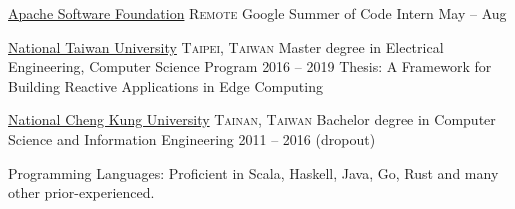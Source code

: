\documentclass[10pt,a4paper]{article}
\begin{document}
\headedsection  %
  {\href{https://summerofcode.withgoogle.com/archive/2018/projects/5211013825691648/}{Apache Software Foundation}}
  {\textsc{Remote}} {%
  \vspace{0.2em}
  \headedsubsection
    {Google Summer of Code Intern}
    {May  -- Aug }
    {}
}

\vspace{0.7em}

\spacedhrule{0em}{-0.4em}


\vspace{0.2em}

\headedsection
  {\href{https://www.ntu.edu.tw}{National Taiwan University}}
  {\textsc{Taipei, Taiwan}} {%
  \headedsubsection
    {Master degree in Electrical Engineering, Computer Science Program}
    {2016 -- 2019}
    {}
    \headedsubsection
    {Thesis: A Framework for Building Reactive Applications in Edge Computing}{}{}
}

\vspace{0.2em}

\headedsection
  {\href{https://web.ncku.edu.tw}{National Cheng Kung University}}
  {\textsc{Tainan, Taiwan}} {%
  \headedsubsection
    {Bachelor degree in Computer Science and Information Engineering}
    {2011 -- 2016 (dropout)}
    {}
}

\vspace{0.7em}

\spacedhrule{0em}{-0.4em}


\vspace{0.2em}

\inlineheadsection
  {Programming Languages:}
  {Proficient in Scala, Haskell, Java, Go, Rust and many other prior-experienced.}
\end{document}
